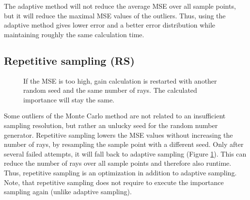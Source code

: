 The adaptive method will not reduce the average MSE over all sample points,
but it will reduce the maximal MSE values of the outliers. Thus, using the adaptive
method gives lower error and a better error distribution while maintaining
roughly the same calculation time.


\subsection{Repetitive sampling (RS)}
\begin{figure}[H]
  \centerline
  {}
  \caption{If the MSE is too high, gain calculation is restarted with another
    random seed and the same number of rays. The calculated importance will stay the same.}
  \label{graphic:pap4}
\end{figure}
Some outliers of the Monte Carlo method are not related to an insufficient
sampling resolution, but rather an unlucky seed for the random number generator.
Repetitive sampling lowers the MSE values without increasing the number of rays,
by resampling the sample point with a different seed. Only after several failed attempts, it will fall back to adaptive
sampling (Figure \ref{graphic:pap4}). This can reduce the number of rays over all sample points and therefore
also runtime. Thus, repetitive sampling is an optimization in addition to adaptive sampling. 
Note, that repetitive sampling does not require to execute the importance
sampling again (unlike adaptive sampling).

